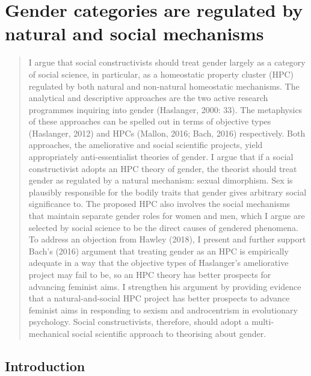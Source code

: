 \chapter{Gender categories are regulated by natural and social mechanisms}


\begin{quote}
    I argue that social constructivists should treat gender largely as a
    category of social science, in particular, as a homeostatic property
    cluster (HPC) regulated by both natural and non-natural homeostatic
    mechanisms. The analytical and descriptive approaches are the two active
    research programmes inquiring into gender (Haslanger, 2000: 33). The
    metaphysics of these approaches can be spelled out in terms of objective
    types (Haslanger, 2012) and HPCs (Mallon, 2016; Bach, 2016)
    respectively. Both approaches, the ameliorative and social scientific
    projects, yield appropriately anti-essentialist theories of gender. I
    argue that if a social constructivist adopts an HPC theory of gender,
    the theorist should treat gender as regulated by a natural mechanism:
    sexual dimorphism. Sex is plausibly responsible for the bodily traits
    that gender gives arbitrary social significance to. The proposed HPC
    also involves the social mechanisms that maintain separate gender roles
    for women and men, which I argue are selected by social science to be
    the direct causes of gendered phenomena. To address an objection from
    Hawley (2018), I present and further support Bach's (2016) argument that
    treating gender as an HPC is empirically adequate in a way that the
    objective types of Haslanger's ameliorative project may fail to be, so
    an HPC theory has better prospects for advancing feminist aims. I
    strengthen his argument by providing evidence that a natural-and-social
    HPC project has better prospects to advance feminist aims in responding
    to sexism and androcentrism in evolutionary psychology. Social
    constructivists, therefore, should adopt a multi-mechanical social
    scientific approach to theorising about gender.
\end{quote}

\vspace{\credgap}

\section*{Introduction}

